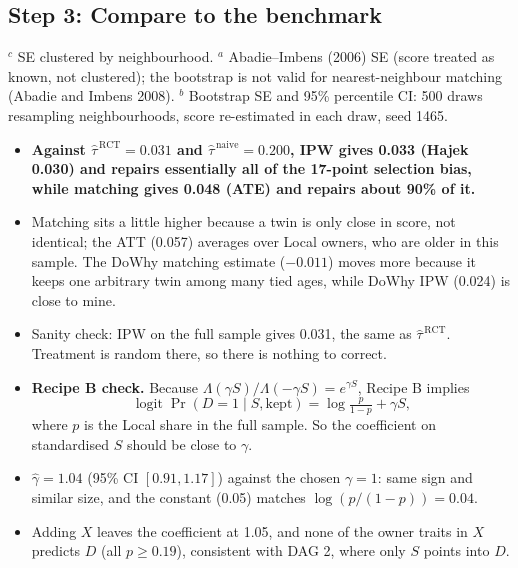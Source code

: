 \documentclass[11pt]{article}
\newcommand{\taurct}{\hat\tau^{\,\mathrm{RCT}}}
\newcommand{\taunaive}{\hat\tau^{\,\mathrm{naive}}}
\begin{document}
\subsection{Step 3: Compare to the benchmark}
\begin{table}[H]\centering\small
\caption{Effect of Local collection on the probability of exemption. Rows 1--2: full experimental sample; all other rows: biased sample.}
\resizebox{\linewidth}{!}{}
\par\smallskip\footnotesize $^c$ SE clustered by neighbourhood. $^a$ Abadie--Imbens (2006) SE (score treated as known, not clustered); the bootstrap is not valid for nearest-neighbour matching (Abadie and Imbens 2008). $^b$ Bootstrap SE and 95\% percentile CI: 500 draws resampling neighbourhoods, score re-estimated in each draw, seed 1465.
\end{table}
\begin{itemize}
\item \textbf{Against $\taurct=0.031$ and $\taunaive=0.200$, IPW gives 0.033 (Hajek 0.030) and repairs essentially all of the 17-point selection bias, while matching gives 0.048 (ATE) and repairs about 90\% of it.}
\item Matching sits a little higher because a twin is only close in score, not identical; the ATT (0.057) averages over Local owners, who are older in this sample. The DoWhy matching estimate ($-0.011$) moves more because it keeps one arbitrary twin among many tied ages, while DoWhy IPW (0.024) is close to mine.
\item Sanity check: IPW on the full sample gives 0.031, the same as $\taurct$. Treatment is random there, so there is nothing to correct.
\item \textbf{Recipe B check.} Because $\Lambda(\gamma S)/\Lambda(-\gamma S)=e^{\gamma S}$, Recipe B implies \[\operatorname{logit}\Pr(D=1\mid S,\text{kept}) = \log\tfrac{p}{1-p} + \gamma S,\] where $p$ is the Local share in the full sample. So the coefficient on standardised $S$ should be close to $\gamma$.
\end{itemize}
\begin{table}[H]\centering\small
\caption{Logistic regression of $D$ on standardised $S$ (full-sample mean and SD, as in the recipe), biased sample, SE clustered by neighbourhood.}

\end{table}
\begin{itemize}
\item $\hat\gamma = 1.04$ (95\% CI $[0.91, 1.17]$) against the chosen $\gamma=1$: same sign and similar size, and the constant (0.05) matches $\log(p/(1-p))=0.04$.
\item Adding $X$ leaves the coefficient at 1.05, and none of the owner traits in $X$ predicts $D$ (all $p\ge0.19$), consistent with DAG 2, where only $S$ points into $D$.
\end{itemize}
\end{document}
